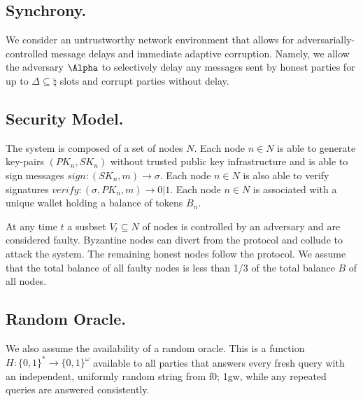 \subsection{Synchrony.}\label{subsec:synchrony.}
We consider an untrustworthy network environment that allows for adversarially-controlled message delays and immediate adaptive corruption.
Namely, we allow the adversary $\Alpha$ to selectively delay any messages sent by honest parties for up to $\Delta \subseteq \natural$ slots and corrupt parties without delay.

\subsection{Security Model.}\label{subsec:security-model.}
The system is composed of a set of nodes $N$.
Each node $n \in N$ is able to generate key-pairs ${(PK_n, SK_n)}$ without trusted public key infrastructure and is able to sign messages ${sign: (SK_n, m) \rightarrow \sigma}$.
Each node $n \in N$ is also able to verify signatures ${verify: (\sigma, PK_n, m) \rightarrow 0 | 1}$.
Each node $n \in N$ is associated with a unique wallet holding a balance of tokens $B_n$.

At any time $t$ a susbset ${V_t \subseteq N}$ of nodes is controlled by an adversary and are considered faulty.
Byzantine nodes can divert from the protocol and collude to attack the system.
The remaining honest nodes follow the protocol.
We assume that the total balance of all faulty nodes is less than 1/3 of the total balance $B$ of all nodes.


\subsection{Random Oracle.}\label{subsec:random-oracle.}
We also assume the availability of a random oracle.
This is a function $H: \{0,1\}^* \rightarrow \{0,1\}^\omega$ available to all parties that answers every fresh query with an independent, uniformly random string from f0; 1gw, while any repeated queries are answered consistently.


